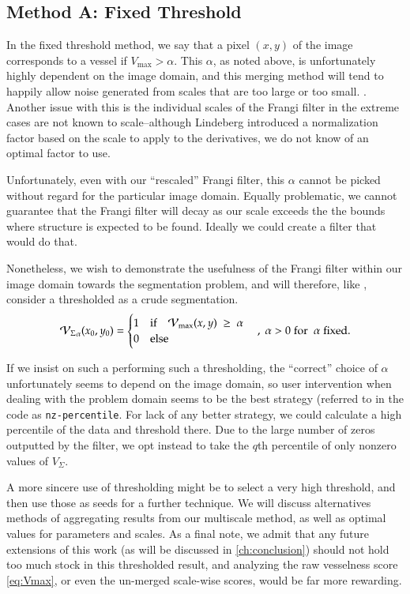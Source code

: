 \subsection{Method A: Fixed Threshold}

In the fixed threshold method, we say that a pixel $(x,y)$ of the image corresponds to a vessel if
$V_{\max} >  \alpha$. This $\alpha$, as noted above, is unfortunately highly dependent on the image domain, and this merging method will tend to happily allow noise generated from scales that are too large or too small. . Another issue with this is the individual scales of the Frangi filter in the extreme cases are not known to scale--although Lindeberg introduced a normalization factor based on the scale to apply to the derivatives, we do not know of an optimal factor to use.

Unfortunately, even with our ``rescaled'' Frangi filter, this $\alpha$ cannot be picked without regard for the particular image domain. Equally problematic, we cannot guarantee that the Frangi filter will decay as our scale exceeds the the bounds where structure is expected to be found. Ideally we could create a filter that would do that.

 Nonetheless, we wish to demonstrate the usefulness of the Frangi filter within our image domain towards the segmentation problem, and will therefore, like \cite{huynh2013filter}, consider a thresholded \Vmax as a crude segmentation. 
\begin{equation}
{\ensuremath{\mathcal{V}_{\Sigma}}}_{\alpha}(x_0,y_0) = \begin{cases}
1 & \textrm{if}\quad \mathcal{V}_{\max}(x,y) \; \ge\;  \alpha \\
0 & \textrm{else}
\end{cases}  \quad , \; \alpha > 0
\; \textrm{for } \; \alpha \;\textrm{fixed}.
\end{equation}

If we insist on such a performing such a thresholding, the ``correct'' choice of $\alpha$ unfortunately seems to depend on the image domain, so user intervention when dealing with the problem domain seems to be the best strategy (referred to in the code as \texttt{nz-percentile}. For lack of any better strategy, we could calculate a high percentile of the data and threshold there. Due to the large number of zeros outputted by the filter, we opt instead to take the $q$th percentile of only nonzero values of $V_\Sigma$.

A more sincere use of thresholding might be to select a very high threshold, and then use those as seeds for a further technique.
We will discuss alternatives methods of aggregating results from our multiscale method, as well as optimal values for parameters and scales. As a final note, we admit that any future extensions of this work (as will be discussed in \cref{ch:conclusion}) should not hold too much stock in this thresholded result, and analyzing the 
raw vesselness score \cref{eq:Vmax}, or even the un-merged scale-wise scores, would be far more rewarding.    
